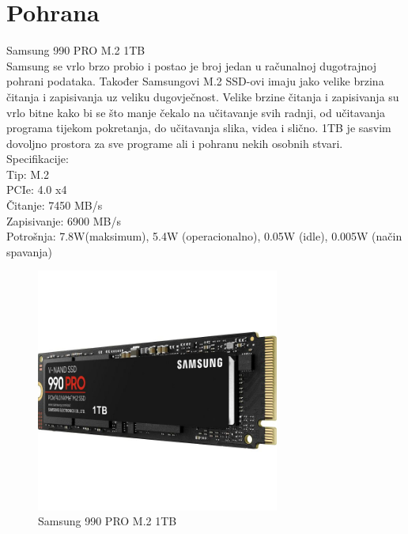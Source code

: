 \documentclass{report}
\begin{document}
\chapter{Pohrana}
Samsung 990 PRO M.2 1TB
\\ Samsung se vrlo brzo probio i postao je broj jedan u računalnoj dugotrajnoj pohrani podataka. Također Samsungovi M.2 SSD-ovi imaju jako velike brzina čitanja i zapisivanja uz veliku dugovječnost. Velike brzine čitanja i zapisivanja su vrlo bitne kako bi se što manje čekalo na učitavanje svih radnji, od učitavanja programa tijekom pokretanja, do učitavanja slika, videa i slično. 1TB je sasvim dovoljno prostora za sve programe ali i pohranu nekih osobnih stvari.
\\Specifikacije:
\\Tip: M.2
\\PCIe: 4.0 x4
\\Čitanje: 7450 MB/s
\\Zapisivanje: 6900 MB/s
\\Potrošnja: 7.8W(maksimum), 5.4W (operacionalno), 0.05W (idle), 0.005W (način spavanja)
\begin{figure}[h]
\includegraphics[width=8cm]{Pohrana.jpg}
\caption{Samsung 990 PRO M.2 1TB}
\end{figure}
\end{document}
